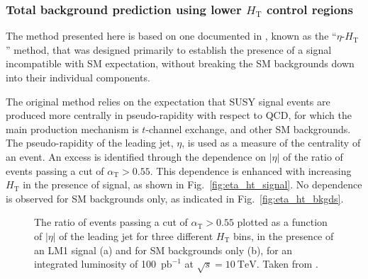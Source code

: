 \subsubsection{Total background prediction using lower $H_{\mathrm{T}}$ control regions \label{sec:lowHTcontrol}}

\newcommand{\ptone}{\ensuremath{P_{\mathrm{T1}}}\xspace}
\newcommand{\pttwo}{\ensuremath{P_{\mathrm{T2}}}\xspace}
\newcommand{\ptall}{\ensuremath{P_{\mathrm{T}}}\xspace}
\newcommand{\aT}{\ensuremath{\alpha_{\mathrm{T}}}\xspace}
\newcommand{\raT}{\ensuremath{R_{\aT}}}
\newcommand{\RaT}{\ensuremath{R_{\aT}}\xspace}
\newcommand{\Npre}{\ensuremath{N_{\mathrm{predicted}}}\xspace}
\newcommand{\Nobs}{\ensuremath{N_{\mathrm{observed}}}\xspace}
\newcommand{\mymet}{\ensuremath{\eslash_{\mathrm{T}}}\xspace}

The method presented here is based on one documented in
\cite{cms-pas-sus-09001}, known as the ``$\eta$-$H_{\mathrm{T}}$''
method, that was designed primarily to establish the presence of a
signal incompatible with SM expectation, without breaking the SM
backgrounds down into their individual components.

The original method relies on the expectation that SUSY signal events
are produced more centrally in pseudo-rapidity with respect to QCD,
for which the main production mechanism is $t$-channel exchange, and
other SM backgrounds. The pseudo-rapidity of the leading jet, $\eta$,
is used as a measure of the centrality of an event. An excess is
identified through the dependence on $|\eta|$ of the ratio of events
passing a cut of $\alpha_{\mathrm{T}} > 0.55$. This dependence is
enhanced with increasing $H_{\mathrm{T}}$ in the presence of signal,
as shown in Fig.~\ref{fig:eta_ht_signal}. No dependence is observed
for SM backgrounds only, as indicated in Fig.~\ref{fig:eta_ht_bkgds}.

\begin{figure}[!h]
  \begin{center} 
    \caption{\label{fig:eta_ht} The ratio of events passing a cut of
      $\alpha_{\mathrm{T}} > 0.55$ plotted as a function of $|\eta|$
      of the leading jet for three different $H_{\mathrm{T}}$ bins, in
      the presence of an LM1 signal (a) and for SM backgrounds only
      (b), for an integrated luminosity of 100~$\mathrm{pb^{-1}}$ at
      $\sqrt{s} = 10~\mathrm{TeV}$. Taken from
      \cite{cms-pas-sus-09001}.}
  \end{center}
\end{figure}

